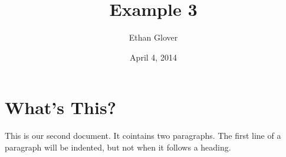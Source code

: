 \documentclass[a4paper,11pt]{article}
\begin{document}
\title{Example 3}

\author{Ethan Glover}

\date{April 4, 2014}

\maketitle

\section{What's This?}

This is our second document. It cointains two paragraphs. The first line of a paragraph will be indented, but not when it follows a heading.

\end{document}
